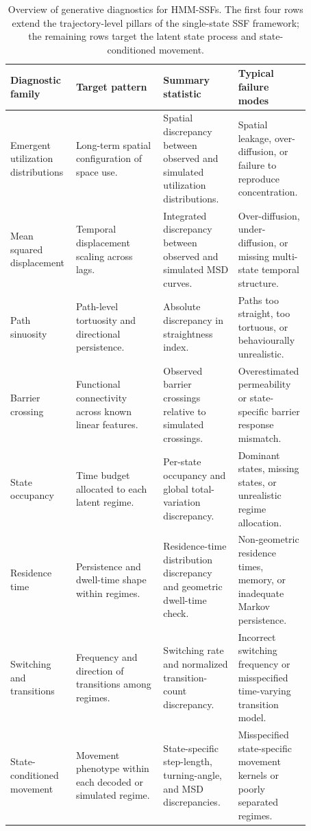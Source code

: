 \documentclass[11pt]{article}
\begin{document}
\begin{table}[ht]
\centering
\caption{Overview of generative diagnostics for HMM-SSFs. The first four rows extend the trajectory-level pillars of the single-state SSF framework; the remaining rows target the latent state process and state-conditioned movement.}
\label{tab:hmm-diagnostics-overview}
\renewcommand{\arraystretch}{1.18}
\setlength{\tabcolsep}{3pt}
\footnotesize
\begin{tabular}{p{0.17\linewidth}p{0.28\linewidth}p{0.24\linewidth}p{0.18\linewidth}}
\toprule
Diagnostic family & Target pattern & Summary statistic & Typical failure modes \\
\midrule
Emergent utilization distributions &
Long-term spatial configuration of space use. &
Spatial discrepancy between observed and simulated utilization distributions. &
Spatial leakage, over-diffusion, or failure to reproduce concentration. \\

Mean squared displacement &
Temporal displacement scaling across lags. &
Integrated discrepancy between observed and simulated MSD curves. &
Over-diffusion, under-diffusion, or missing multi-state temporal structure. \\

Path sinuosity &
Path-level tortuosity and directional persistence. &
Absolute discrepancy in straightness index. &
Paths too straight, too tortuous, or behaviourally unrealistic. \\

Barrier crossing &
Functional connectivity across known linear features. &
Observed barrier crossings relative to simulated crossings. &
Overestimated permeability or state-specific barrier response mismatch. \\

State occupancy &
Time budget allocated to each latent regime. &
Per-state occupancy and global total-variation discrepancy. &
Dominant states, missing states, or unrealistic regime allocation. \\

Residence time &
Persistence and dwell-time shape within regimes. &
Residence-time distribution discrepancy and geometric dwell-time check. &
Non-geometric residence times, memory, or inadequate Markov persistence. \\

Switching and transitions &
Frequency and direction of transitions among regimes. &
Switching rate and normalized transition-count discrepancy. &
Incorrect switching frequency or misspecified time-varying transition model. \\

State-conditioned movement &
Movement phenotype within each decoded or simulated regime. &
State-specific step-length, turning-angle, and MSD discrepancies. &
Misspecified state-specific movement kernels or poorly separated regimes. \\
\bottomrule
\end{tabular}
\end{table}
\end{document}
